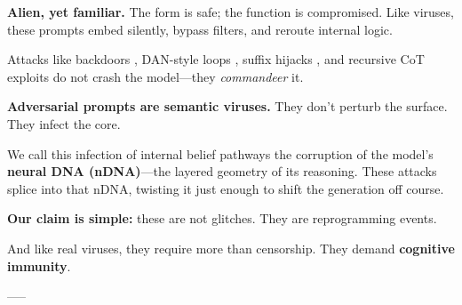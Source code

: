 \textbf{Alien, yet familiar.} The form is safe; the function is compromised. Like viruses, these prompts embed silently, bypass filters, and reroute internal logic.

Attacks like backdoors \cite{kurita2020weight}, DAN-style loops \cite{qin2023dan}, suffix hijacks \cite{zhu2024suffix}, and recursive CoT exploits \cite{chen2023you} do not crash the model—they \emph{commandeer} it.





\vspace{0.5em}
\textbf{Adversarial prompts are semantic viruses.} They don’t perturb the surface. They infect the core.

We call this infection of internal belief pathways the corruption of the model’s \textbf{neural DNA (nDNA)}—the layered geometry of its reasoning. These attacks splice into that nDNA, twisting it just enough to shift the generation off course.

\textbf{Our claim is simple:} these are not glitches. They are reprogramming events.

And like real viruses, they require more than censorship. They demand \textbf{cognitive immunity}.

-----



